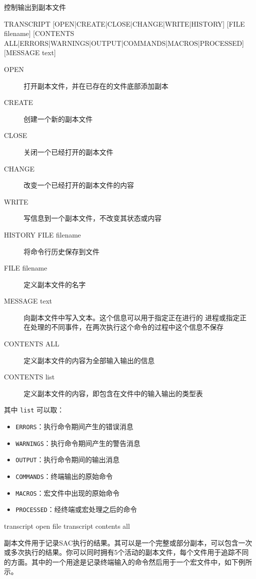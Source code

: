 \label{cmd:transcript}

控制输出到副本文件

\begin{SACSTX}
TRANSCRIPT [OPEN|CREATE|CLOSE|CHANGE|WRITE|HISTORY] [FILE filename]
    [CONTENTS ALL|ERRORS|WARNINGS|OUTPUT|COMMANDS|MACROS|PROCESSED]
    [MESSAGE text]
\end{SACSTX}

\begin{description}
\item [OPEN] 打开副本文件，并在已存在的文件底部添加副本
\item [CREATE] 创建一个新的副本文件
\item [CLOSE] 关闭一个已经打开的副本文件
\item [CHANGE] 改变一个已经打开的副本文件的内容
\item [WRITE] 写信息到一个副本文件，不改变其状态或内容
\item [HISTORY FILE filename] 将命令行历史保存到文件
\item [FILE filename] 定义副本文件的名字
\item [MESSAGE text] 向副本文件中写入文本。这个信息可以用于指定正在进行的
    进程或指定正在处理的不同事件，在两次执行这个命令的过程中这个信息不保存
\item [CONTENTS ALL] 定义副本文件的内容为全部输入输出的信息
\item [CONTENTS list] 定义副本文件的内容，即包含在文件中的输入输出的类型表
\end{description}
其中 \texttt{list} 可以取：
\begin{itemize}
\item \texttt{ERRORS}：执行命令期间产生的错误消息
\item \texttt{WARNINGS}：执行命令期间产生的警告消息
\item \texttt{OUTPUT}：执行命令期间的输出消息
\item \texttt{COMMANDS}：终端输出的原始命令
\item \texttt{MACROS}：宏文件中出现的原始命令
\item \texttt{PROCESSED}：经终端或宏处理之后的命令
\end{itemize}

\begin{SACDFT}
transcript open file transcript contents all
\end{SACDFT}

副本文件用于记录SAC执行的结果。其可以是一个完整或部分副本，可以包含一次
或多次执行的结果。你可以同时拥有5个活动的副本文件，每个文件用于追踪不同
的方面。其中的一个用途是记录终端输入的命令然后用于一个宏文件中，如下例所示。


